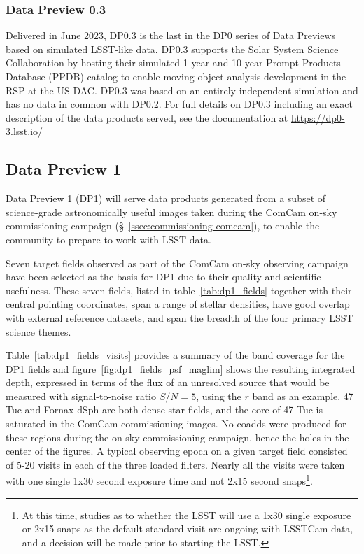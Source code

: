 \subsubsection{Data Preview 0.3}
\label{sec:dp03}

Delivered in June  2023, DP0.3 is the last in the DP0 series of Data Previews based on simulated LSST-like data. 
DP0.3 supports the Solar System Science Collaboration by hosting their simulated 1-year and 10-year Prompt Products Database (PPDB) catalog to enable moving object analysis development in the RSP at the US DAC.
DP0.3 was based on an entirely independent simulation and has no data in common with DP0.2.
For full details on DP0.3 including an exact description of the data products served, see the documentation at \url{https://dp0-3.lsst.io/}

\subsection{Data Preview 1}
\label{ssec:dp1}

Data Preview 1 (DP1) will serve data products generated from a subset of science-grade astronomically useful images  taken  during  the ComCam on-sky commissioning campaign (\S~\ref{ssec:commissioning-comcam}), to enable the community to prepare to work with LSST data. 

Seven target fields observed as part of the ComCam on-sky observing campaign  have been selected as the basis for DP1 due to their quality and scientific usefulness.  
These seven fields, listed in table~\ref{tab:dp1_fields} together with their central pointing coordinates, span a range of stellar densities, have good overlap with external reference datasets, and span the breadth of the four primary LSST science themes.


Table~\ref{tab:dp1_fields_visits} provides a summary of the band coverage for the DP1 fields and figure~\ref{fig:dp1_fields_psf_maglim} shows the
resulting integrated depth, expressed in terms of the flux of an unresolved source that would be measured with signal-to-noise ratio $S/N = 5$, using the $r$ band as an example.
47 Tuc and Fornax dSph are both dense star fields, and the core of 47 Tuc is saturated in the ComCam commissioning images.
No coadds were produced for these regions during the on-sky commissioning campaign, hence the holes in the center of the figures.
A typical observing epoch on a given target field consisted of 5-20 visits in each of the three loaded filters.
Nearly all the visits  were taken with one single 1x30 second exposure time and not  2x15 second snaps\footnote{At this time, studies as to whether the LSST will use a 1x30 single exposure or 2x15 snaps as the default standard visit are ongoing with LSSTCam data, and a decision will be made prior to starting the LSST. }.


